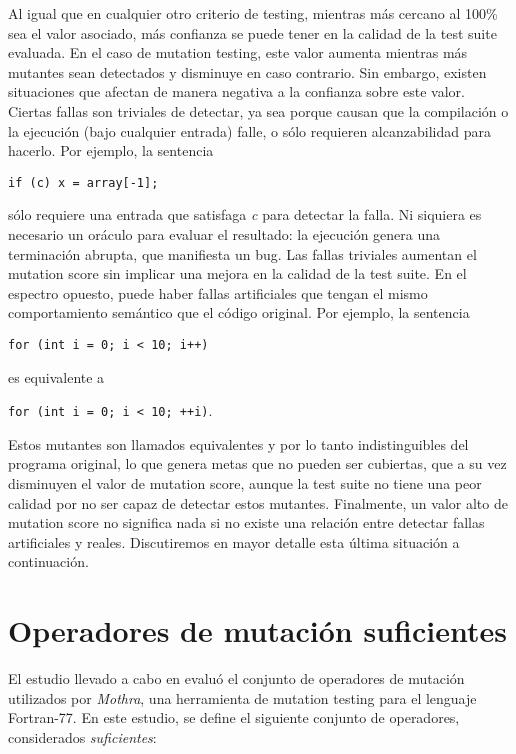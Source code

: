 Al igual que en cualquier otro criterio de testing, mientras m\'as cercano al 100\% sea el valor asociado, m\'as confianza se puede tener en la calidad de la test suite evaluada. En el caso de mutation testing, este valor aumenta mientras m\'as mutantes sean detectados y disminuye en caso contrario. Sin embargo, existen situaciones que afectan de manera negativa a la confianza sobre este valor. Ciertas fallas son triviales de detectar, ya sea porque causan que la compilaci\'on o la ejecuci\'on (bajo cualquier entrada) falle, o s\'olo requieren alcanzabilidad para hacerlo. Por ejemplo, la sentencia

 \lstinline|if (c) x = array[-1];| 

\noindent
s\'olo requiere una entrada que satisfaga \emph{c} para detectar la falla. Ni siquiera es necesario un or\'aculo para evaluar el resultado: la ejecuci\'on genera una terminaci\'on abrupta, que manifiesta un bug. Las fallas triviales aumentan el mutation score sin implicar una mejora en la calidad de la test suite. En el espectro opuesto, puede haber fallas artificiales que tengan el mismo comportamiento sem\'antico que el c\'odigo original. Por ejemplo, la sentencia

 \lstinline|for (int i = 0; i < 10; i++)| 

\noindent
es equivalente a 

\lstinline|for (int i = 0; i < 10; ++i)|. 

\noindent
Estos mutantes son llamados equivalentes y por lo tanto indistinguibles del programa original, lo que genera metas que no pueden ser cubiertas, que a su vez disminuyen el valor de mutation score, aunque la test suite no tiene una peor calidad por no ser capaz de detectar estos mutantes. Finalmente, un valor alto de mutation score no significa nada si no existe una relaci\'on entre detectar fallas artificiales y reales. Discutiremos en mayor detalle esta \'ultima situaci\'on a continuaci\'on.

\section{Operadores de mutaci\'on suficientes}
\label{sec:preliminares.mutation.sufficient}

El estudio llevado a cabo en \cite{bibliography.mutation.selection.Offutt96} evalu\'o el conjunto de operadores de mutaci\'on utilizados por \emph{Mothra}, una herramienta de mutation testing para el lenguaje Fortran-77. En este estudio, se define el siguiente conjunto de operadores, considerados \emph{suficientes}:

